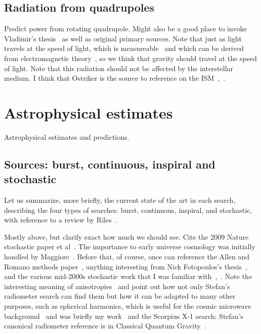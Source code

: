         \subsection{Radiation from quadrupoles}
        \label{radiation}
  
            Predict power from rotating quadrupole. Might also be a good place to invoke Vladimir's thesis~\cite{DergachevThesis} as well as original primary sources. Note that just as light travels at the speed of light, which is measureable~\cite{CODATA} and which can be derived from electromagnetic theory~\cite{GriffithsE}, so we think that gravity should travel at the speed of light. Note that this radiation should not be affected by the interstellar medium. I think that Ostriker is the source to reference on the ISM~\cite{Caldwell1981},~\cite{McKee1977}.

    \section{Astrophysical estimates}
    \label{estimates}

        Astrophysical estimates and predictions.

        \subsection{Sources: burst, continuous, inspiral and stochastic}
        \label{source_types}


            Let us summarize, more briefly, the current state of the art in each search, describing the four types of searches: burst, continuous, inspiral, and stochastic, with reference to a review by Riles~\cite{Riles2013}.

		Mostly above, but clarify exact how much we should see. Cite the 2009 Nature stochastic paper et al~\cite{LIGOStochasticNature2009}. The importance to early universe cosmology was initially handled by Maggiore~\cite{Maggiore2000}. Before that, of course, once can reference the Allen and Romano methods paper~\cite{Allen1999}, anything interesting from Nick Fotopoulos's thesis~\cite{FotopoulosThesis}, and the various mid-2000s stochastic work that I was familiar with~\cite{Abbott2006},~\cite{Abbott2007}. Note the interesting meaning of anisotropies~\cite{Allen1997} and point out how not only Stefan's radiometer search can find them but how it can be adapted to many other purposes, such as spherical harmonics, which is useful for the cosmic microwave background~\cite{Muciaccia1997} and was briefly my work~\cite{MeadorsCaltech2007} and the Scorpius X-1 search; Stefan's canonical radiometer reference is in Classical Quantum Gravity~\cite{Radiometer2006}.

